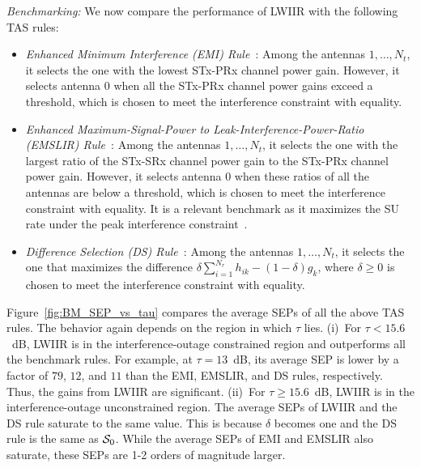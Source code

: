\documentclass[12pt,draftcls,peerreview,onecolumn]{IEEEtran}
\newcommand{\Nt}{{N_t}}
\newcommand{\Nr}{{N_r}}
\newcommand{\such}{h}
\newcommand{\puch}{g}
\newcommand{\hk}[1]{{\such_{#1}}}
\newcommand{\gk}[1]{{\puch_{#1}}}
\newcommand{\itau}{\tau}
\newcommand{\caluncons}{{\cal S_{\text{0}}}}
\newcommand{\sumnr}{\sum_{i=1}^{\Nr}}
\begin{document}
{\em Benchmarking:} We now compare the performance of LWIIR with the following TAS rules:
\begin{itemize}
\item {\em Enhanced Minimum Interference (EMI) Rule~\cite{Sarvendranath_2013_TCOM}}: Among the antennas $1,\ldots,\Nt$, it selects the one with the lowest STx-PRx channel power gain. However, it selects antenna $0$ when all the STx-PRx channel power gains exceed a threshold, which is chosen to meet the interference constraint with equality. 

\item {\em Enhanced Maximum-Signal-Power to Leak-Interference-Power-Ratio (EMSLIR) Rule~\cite{Sarvendranath_2013_TCOM}}: Among the antennas $1,\ldots,\Nt$, it selects the one with the largest ratio of the STx-SRx channel power gain to the STx-PRx channel power gain. However, it selects antenna $0$ when these ratios of all the antennas are below a threshold, which is chosen to meet the interference constraint with equality. It is a relevant benchmark as it maximizes the SU rate under the peak interference constraint~\cite{Wang_2010_TWC}. 

\item {\em Difference Selection (DS) Rule~\cite{Wang_2011_TCom,Sarvendranath_2014_TCOM}}: Among the antennas $1,\ldots,\Nt$, it selects the one that maximizes the difference $\delta \sumnr\hk{ik} -(1-\delta) \gk{k} $, where $\delta\geq 0$ is chosen to meet the interference constraint with equality.   

\end{itemize}


Figure~\ref{fig:BM_SEP_vs_tau} compares the average SEPs of all the above TAS rules. The behavior again depends on the region in which $\itau$ lies. (i)~For $\itau < 15.6$~dB, LWIIR is in the interference-outage constrained region and outperforms all the benchmark rules. For example, at $\itau=13$~dB,  its average SEP is lower by a factor of $79$, $12$, and $11$ than the EMI, EMSLIR, and DS rules, respectively. Thus, the gains from LWIIR are significant. (ii)~For $\itau \geq 15.6$~dB, LWIIR is in the interference-outage unconstrained region. The average SEPs of LWIIR and the DS rule saturate to the same value. This is because $\delta$ becomes one and the DS rule is the same as $\caluncons$. While the average SEPs of EMI and EMSLIR also saturate, these SEPs are 1-2 orders of magnitude larger. 
\end{document}
